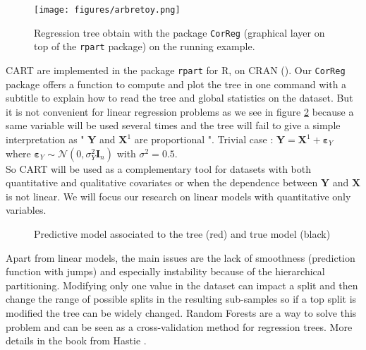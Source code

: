 \documentclass[12pt,a4paper]{report}
\begin{document}
		\begin{figure}
			\centering
				\texttt{[image: figures/arbretoy.png]} 
			\caption{Regression tree obtain with the package {\tt CorReg}
			 (graphical layer on top of  the {\tt rpart} package) on the running example.}\label{arbretoy}
		\end{figure}
		CART are implemented in the package {\tt rpart} 
		for R, on CRAN (\cite{packagerpart}). Our {\tt CorReg} 
		package offers a function to compute and plot the tree in one command with a subtitle to explain how to read the tree and global statistics on the dataset.
		But it is not convenient for linear regression problems as we see in figure \ref{arbretrivial} because a same variable will be used several times and the tree will fail to give a simple interpretation as " $\boldsymbol{Y}$ and $\boldsymbol{X}^1$ are proportional ". Trivial case : $\boldsymbol{Y}=\boldsymbol{X}^1 + \boldsymbol{\varepsilon}_Y$ where $\boldsymbol{\varepsilon}_Y \sim \mathcal{N}(0, \sigma^2_Y \boldsymbol{I}_n)$ with $\sigma^2=0.5$. \\
		
		So CART will be used as a complementary tool for datasets with both quantitative and qualitative covariates or when the dependence between $\boldsymbol{Y}$ and $\boldsymbol{X}$ is not linear. We will focus our research on linear models with quantitative only variables.
	\\
	
\begin{figure}[h!]
	 \quad
	\caption{Predictive model associated to the tree (red) and true model (black)}\label{arbretrivial}
\end{figure}

 Apart from linear models, the main issues are the lack of smoothness (prediction function with jumps) and especially instability because of the hierarchical partitioning. Modifying only one value in the dataset can impact a split and then change the range of possible splits in the resulting sub-samples so if a top split is modified the tree can be widely changed. Random Forests are a way to solve this problem and can be seen as a cross-validation method for regression trees. More details in the book from Hastie \cite{hastie2009elements}.
	
\end{document}
